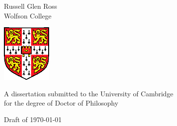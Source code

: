 
\begin{titlepage}
\begin{center}
\vspace*{\fill}

\huge
\thesistitlebig

\vfill
\vfill

\huge
Russell Glen Ross\\[6mm]
\large
Wolfson College

\vfill
\includegraphics[width=70pt]{figures/camshield}
\vfill

\large
A dissertation submitted to the University of Cambridge\\
for the degree of Doctor of Philosophy

\vfill

Draft of \today

\vspace*{\fill}
\end{center}
\end{titlepage}